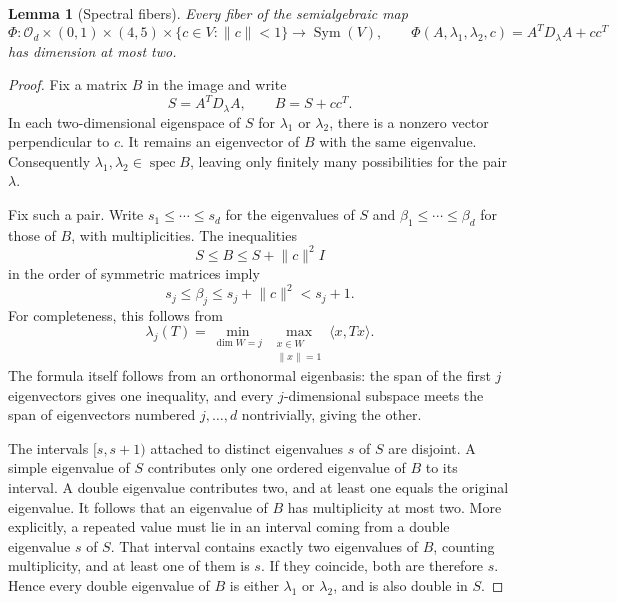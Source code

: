 \documentclass[11pt,reqno]{amsart}
\newtheorem{lemma}[lemma]{Lemma}
\theoremstyle{definition}
\theoremstyle{remark}
\numberwithin{equation}{section}
\newcommand{\Orth}{\mathcal O_d}
\newcommand{\ip}[2]{\langle #1,#2\rangle}
\newcommand{\norm}[1]{\lVert #1\rVert}
\DeclareMathOperator{\Sym}{Sym}
\DeclareMathOperator{\spec}{spec}
\begin{document}
\begin{lemma}[Spectral fibers]\label{lem:spectral}
Every fiber of the semialgebraic map
\begin{equation}\label{eq:spectral-map}
 \Phi:\Orth\times(0,1)\times(4,5)\times\{c\in V:\norm c<1\}
 \longrightarrow\Sym(V),\qquad
 \Phi(A,\lambda_1,\lambda_2,c)=A^TD_\lambda A+cc^T
\end{equation}
has dimension at most two.
\end{lemma}
\begin{proof}
Fix a matrix $B$ in the image and write
\[
 S=A^TD_\lambda A,\qquad B=S+cc^T.
\]
In each two-dimensional eigenspace of $S$ for $\lambda_1$ or
$\lambda_2$, there is a nonzero vector perpendicular to $c$.
It remains an eigenvector of $B$ with the same eigenvalue.
Consequently $\lambda_1,\lambda_2\in\spec B$, leaving only finitely
many possibilities for the pair $\lambda$.

Fix such a pair. Write $s_1\leq\cdots\leq s_d$ for the eigenvalues
of $S$ and $\beta_1\leq\cdots\leq\beta_d$ for those of $B$,
with multiplicities. The inequalities
\[
 S\leq B\leq S+\norm c^2I
\]
in the order of symmetric matrices imply
\begin{equation}\label{eq:eigen-bounds}
 s_j\leq\beta_j\leq s_j+\norm c^2<s_j+1.
\end{equation}
For completeness, this follows from
\[
 \lambda_j(T)=\min_{\dim W=j}\ 
              \max_{\substack{x\in W\\\norm x=1}}\ip{x}{Tx}.
\]
The formula itself follows from an orthonormal eigenbasis: the span
of the first $j$ eigenvectors gives one inequality, and every
$j$-dimensional subspace meets the span of eigenvectors numbered
$j,\ldots,d$ nontrivially, giving the other.

The intervals $[s,s+1)$ attached to distinct eigenvalues $s$ of $S$
are disjoint. A simple eigenvalue of $S$ contributes only one ordered
eigenvalue of $B$ to its interval. A double eigenvalue contributes two,
and at least one equals the original eigenvalue. It follows that an
eigenvalue of $B$ has multiplicity at most two. More explicitly, a
repeated value must lie in an interval coming from a double eigenvalue
$s$ of $S$. That interval contains exactly two eigenvalues of $B$,
counting multiplicity, and at least one of them is $s$. If they coincide,
both are therefore $s$. Hence every double eigenvalue of $B$ is either
$\lambda_1$ or $\lambda_2$, and is also double in $S$.


\end{proof}
\end{document}
